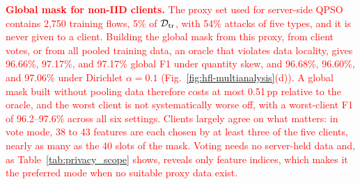 \documentclass[conference]{IEEEtran}
\begin{document}
\textcolor{red}{\textbf{Global mask for non-IID clients.}
The proxy set used for server-side QPSO contains 2{,}750 training
flows, 5\% of $\mathcal{D}_{\rm tr}$, with 54\% attacks of five types,
and it is never given to a client. Building the global mask from this
proxy, from client votes, or from all pooled training data, an oracle
that violates data locality, gives 96.66\%, 97.17\%, and 97.17\%
global F1 under quantity skew, and 96.68\%, 96.60\%, and 97.06\% under
Dirichlet $\alpha=0.1$ (Fig.~\ref{fig:hfl-multianalysis}(d)). A
global mask built without pooling data therefore costs at most
0.51\,pp relative to the oracle, and the worst client is not
systematically worse off, with a worst-client F1 of 96.2--97.6\%
across all six settings. Clients largely agree on what matters: in
vote mode, 38 to 43 features are each chosen by at least three of the
five clients, nearly as many as the 40 slots of the mask. Voting needs no server-held data and,
as Table~\ref{tab:privacy_scope} shows, reveals only feature indices,
which makes it the preferred mode when no suitable proxy data exist.}
\end{document}
